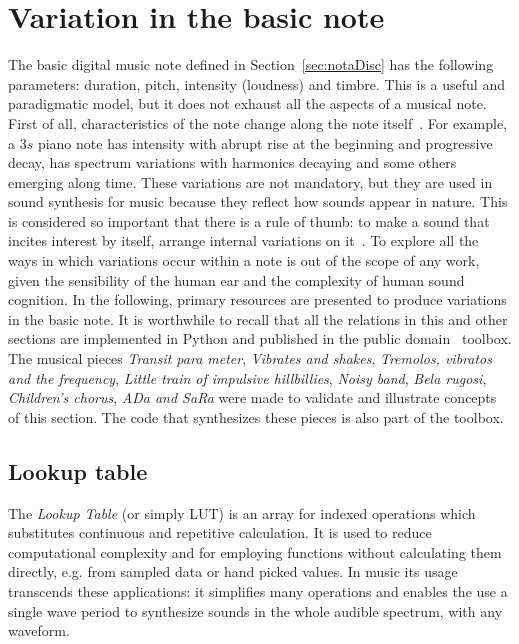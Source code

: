 \section{Variation in the basic note}\label{sec:internalVar}\label{sec:varInternas}
The basic digital music note defined in Section~\ref{sec:notaDisc} has the following parameters: duration, pitch, intensity (loudness) and timbre. This is a useful and paradigmatic model, but it does not exhaust all the aspects of a musical note. First of all, characteristics of the note change along the note itself~\cite{Chowning}. For example, a $3s$ piano note has intensity with abrupt rise at the beginning and progressive decay, has spectrum variations with harmonics decaying and some others emerging along time. These variations are not mandatory, but they are used in sound synthesis for music because they reflect how sounds appear in nature. This is considered so important that there is a rule of thumb: to make a sound that incites interest by itself, arrange internal variations on it~\cite{Roederer}.
To explore all the ways in which variations occur within a note is out of the scope of any work, given the sensibility of the human ear and the complexity of human sound cognition. In the following, primary resources are presented to produce variations in the basic note. It is worthwhile to recall that all the relations in this and other sections are implemented in Python and published in the public domain \massa\ toolbox. The musical pieces \emph{Transit para meter}, \emph{Vibrates and shakes}, \emph{Tremolos, vibratos and the frequency}, \emph{Little train of impulsive hillbillies}, \emph{Noisy band}, \emph{Bela rugosi}, \emph{Children's chorus}, \emph{ADa and SaRa} were made to validate and illustrate concepts of this section. The code that synthesizes these pieces is also part of the toolbox\cite{MASSA}.
 
\subsection{Lookup table}\label{subsec:lookup}
The \emph{Lookup Table} (or simply LUT) is an array for indexed operations which substitutes continuous and repetitive calculation. It is used to reduce computational complexity and for employing functions without calculating them directly, e.g. from sampled data or hand picked values.
In music its usage transcends these applications: it simplifies many operations and enables the use a single wave period to synthesize sounds in the whole audible spectrum, with any waveform.


